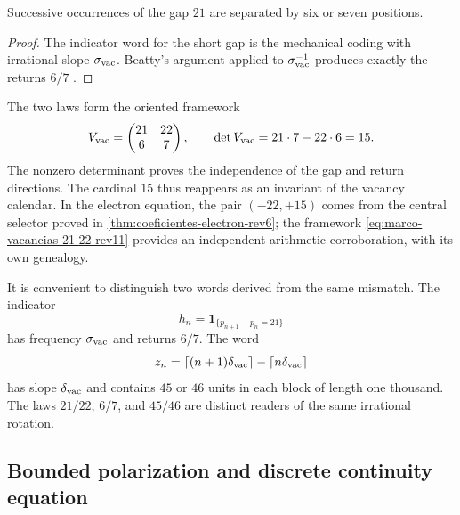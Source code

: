 \begin{corollary}
\label{cor:ley-retorno-vacancias-rev11}
Successive occurrences of the gap \(21\) are separated by six or
seven positions.
\end{corollary}

\begin{proof}
The indicator word for the short gap is the mechanical coding with
irrational slope \(\sigma_{\rm vac}\). Beatty's argument applied to
\(\sigma_{\rm vac}^{-1}\) produces exactly the returns \(6/7\)
\cite{Lothaire2002}.
\end{proof}

The two laws form the oriented framework
\begin{equation}
 V_{\rm vac}=
 \begin{pmatrix}21&22\\6&7\end{pmatrix},
 \qquad
 \det V_{\rm vac}=21\cdot7-22\cdot6=15.
 \label{eq:marco-vacancias-21-22-rev11}
\end{equation}
The nonzero determinant proves the independence of the gap and return
directions. The cardinal \(15\) thus reappears as an invariant of the
vacancy calendar. In the electron equation, the pair
\((-22,+15)\) comes from the central selector proved in
\cref{thm:coeficientes-electron-rev6}; the framework
\eqref{eq:marco-vacancias-21-22-rev11} provides an independent arithmetic
corroboration, with its own genealogy.

It is convenient to distinguish two words derived from the same mismatch. The
indicator
\[
 h_n=\mathbf 1_{\{p_{n+1}-p_n=21\}}
\]
has frequency \(\sigma_{\rm vac}\) and returns \(6/7\). The word
\[
 z_n=\lceil(n+1)\delta_{\rm vac}\rceil
      -\lceil n\delta_{\rm vac}\rceil
\]
has slope \(\delta_{\rm vac}\) and contains \(45\) or \(46\) units
in each block of length one thousand. The laws \(21/22\), \(6/7\), and \(45/46\)
are distinct readers of the same irrational rotation.

\subsection{Bounded polarization and discrete continuity equation}

